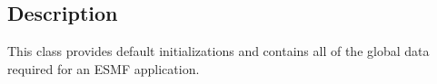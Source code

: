 \subsection{Description}

This class provides default initializations and contains all of the global data 
required for an ESMF application.





